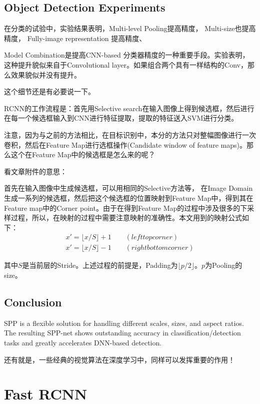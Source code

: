 \subsection{Object Detection Experiments}

在分类的试验中，实验结果表明，Multi-level Pooling提高精度， Multi-size也提高精度， Fully-image representation 提高精度、

Model Combination是提高CNN-based 分类器精度的一种重要手段。实验表明，这种提升貌似来自于Convolutional layer。如果组合两个具有一样结构的Conv，那么效果貌似并没有提升。

这个细节还是有必要说一下。

RCNN的工作流程是：首先用Selective search在输入图像上得到候选框，然后进行在每一个候选框输入到CNN进行特征提取，提取的特征送入SVM进行分类。

注意，因为与之前的方法相比，在目标识别中，本分的方法只对整幅图像进行一次卷积，然后在Feature Map进行选框操作(Candidate window of feature maps)。那么这个在Feature Map中的候选框是怎么来的呢？

看文章附件的意思：

首先在输入图像中生成候选框，可以用相同的Selective方法等， 在Image Domain生成一系列的候选框，然后把这个候选框的位置映射到Feature Map中，得到其在Feature map中的Corner point。由于在得到Feature Map的过程中涉及很多的下采样过程，所以，在映射的过程中需要注意映射的准确性。本文用到的映射公式如下：
\begin{displaymath}
\begin{gathered}
x' = \lfloor x/S  \rfloor + 1 \qquad  (left top corner)\\
x' = \lfloor x/S \rfloor - 1 \qquad (right bottom corner)
\end{gathered}
\end{displaymath}

其中$S$是当前层的Stride。上述过程的前提是，Padding为$\lfloor p/2 \rfloor$。$p$为Pooling的size。

\subsection{Conclusion}

SPP is a flexible solution for handling different scales, sizes, and aspect ratios. The resulting SPP-net shows outstanding accuracy in classification/detection tasks and greatly accelerates DNN-based detection.

还有就是，一些经典的视觉算法在深度学习中，同样可以发挥重要的作用！

\section{Fast RCNN}

